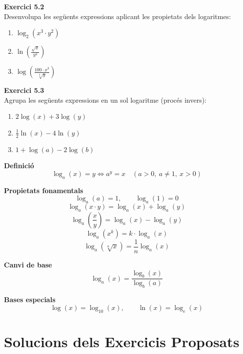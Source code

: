 \documentclass[12pt]{article}
\begin{document}
\begin{exercici}
\textbf{Exercici 5.2}\\
Desenvolupa les següents expressions aplicant les propietats dels logaritmes:
\begin{enumerate}[label=\alph*)]
    \item $\log_2\left(x^3 \cdot y^2\right)$
    \item $\ln\left(\frac{\sqrt{x}}{y^4}\right)$
    \item $\log\left(\frac{100 \cdot x^3}{\sqrt[3]{y}}\right)$
\end{enumerate}
\end{exercici}

\begin{exercici}
\textbf{Exercici 5.3}\\
Agrupa les següents expressions en un sol logaritme (procés invers):
\begin{enumerate}[label=\alph*)]
    \item $2\log(x) + 3\log(y)$
    \item $\frac{1}{2}\ln(x) - 4\ln(y)$
    \item $1 + \log(a) - 2\log(b)$
\end{enumerate}
\end{exercici}

\begin{resum}[title=Resum del Tema 5: Logaritmes]
\textbf{Definició}
\[
\log_a(x) = y \iff a^y = x \quad (a > 0, \ a \neq 1, \ x > 0)
\]

\textbf{Propietats fonamentals}
\[
\log_a(a) = 1, \qquad \log_a(1) = 0
\]
\[
\log_a(x \cdot y) = \log_a(x) + \log_a(y)
\]
\[
\log_a\!\left(\frac{x}{y}\right) = \log_a(x) - \log_a(y)
\]
\[
\log_a(x^k) = k \cdot \log_a(x)
\]
\[
\log_a(\sqrt[n]{x}) = \frac{1}{n} \log_a(x)
\]

\textbf{Canvi de base}
\[
\log_a(x) = \frac{\log_b(x)}{\log_b(a)}
\]

\textbf{Bases especials}
\[
\log(x) = \log_{10}(x), \qquad \ln(x) = \log_e(x)
\]
\end{resum}

\newpage

\appendix
\section{Solucions dels Exercicis Proposats}
\end{document}

